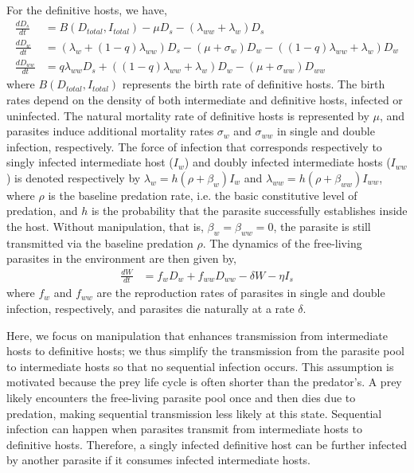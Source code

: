 \documentclass[a4paper]{scrartcl}
\begin{document}
For the definitive hosts, we have,
%
\begin{align}
\frac{dD_s}{dt} &= B(D_{total},  I_{total})  - \mu D_s - (\lambda_{ww} + \lambda_w) D_s \nonumber \\    
\frac{dD_w}{dt} &= (\lambda_w + (1 - q) \lambda_{ww}) D_s - (\mu + \sigma_w) D_w - ((1 - q) \lambda_{ww} + \lambda_w) D_w  \label{odes:dhosts} \\         
\frac{dD_{ww}}{dt} &= q \lambda_{ww} D_s + ((1 - q) \lambda_{ww} + \lambda_w) D_w - (\mu + \sigma_{ww}) D_{ww} \nonumber
\end{align}
%
where $B(D_{total},  I_{total})$ represents the birth rate of definitive hosts.
The birth rates depend on the density of both intermediate and definitive hosts, infected or uninfected. 
The natural mortality rate of definitive hosts is represented by $\mu$, and parasites induce additional mortality rates $\sigma_w$ and $\sigma_{ww}$ in single and double infection, respectively.
The force of infection that corresponds respectively to singly infected intermediate host ($I_w$) and doubly infected intermediate hosts ($I_{ww}$) is denoted respectively by $\lambda_w = h (\rho + \beta_w)  I_w$ and $\lambda_{ww} = h (\rho + \beta_{ww}) I_{ww}$, where $\rho$ is the baseline predation rate, i.e. the basic constitutive level of predation, and $h$ is the probability that the parasite successfully establishes inside the host.
Without manipulation, that is, $\beta_w = \beta_{ww} = 0$, the parasite is still transmitted via the baseline predation $\rho$. 
The dynamics of the free-living parasites in the environment are then given by,
\begin{align}
	\frac{dW}{dt} &= f_w D_w + f_{ww} D_{ww} - \delta W - \eta I_s
	\label{odes:eparasite}
\end{align}
where $f_w$ and $f_{ww}$ are the reproduction rates of parasites in single and double infection, respectively, and parasites die naturally at a rate $\delta$.

Here, we focus on manipulation that enhances transmission from intermediate hosts to definitive hosts; we thus simplify the transmission from the parasite pool to intermediate hosts so that no sequential infection occurs. 
This assumption is motivated because the prey life cycle is often shorter than the predator's. 
A prey likely encounters the free-living parasite pool once and then dies due to predation, making sequential transmission less likely at this state.
Sequential infection can happen when parasites transmit from intermediate hosts to definitive hosts. 
Therefore, a singly infected definitive host can be further infected by another parasite if it consumes infected intermediate hosts. 
%
\end{document}
